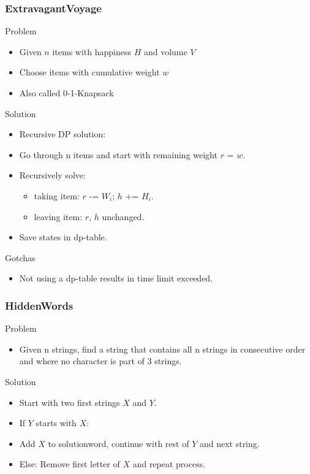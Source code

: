 \documentclass{beamer}
\begin{document}
\begin{frame}
    \frametitle{ExtravagantVoyage}
    \begin{block}{Problem}
        \begin{itemize}
            \item Given $n$ items with happiness $H$ and volume $V$
            \item Choose items with cumulative weight $w$
            \item Also called 0-1-Knapsack
        \end{itemize}
    \end{block}
    \begin{block}{Solution}
        \begin{itemize}
            \item Recursive DP solution:
            \item Go through n items and start with remaining weight $r$ = $w$.
            \item Recursively solve:
            \begin{itemize}
            \item taking item: $r$ -= $W_i$; $h$ += $H_i$.
            \item leaving item: $r$, $h$ unchanged.
            \end{itemize}
            \item Save states in dp-table.
        \end{itemize}
    \end{block}
    \begin{block}{Gotchas}
        \begin{itemize}
            \item Not using a dp-table results in time limit exceeded.
        \end{itemize}
    \end{block}
\end{frame}



\begin{frame}
    \frametitle{HiddenWords}
    \begin{block}{Problem}
        \begin{itemize}
            \item Given n strings, find a string that contains all n strings in consecutive order and where no character is part of 3 strings.
        \end{itemize}
    \end{block}
    \begin{block}{Solution}
        \begin{itemize}
            \item Start with two first strings $X$ and $Y$.
            \item If $Y$ starts with $X$:
            \item Add $X$ to solutionword, continue with rest of $Y$ and next string.
            \item Else: Remove first letter of $X$ and repeat process.
        \end{itemize}
    \end{block}
\end{frame}
\end{document}
